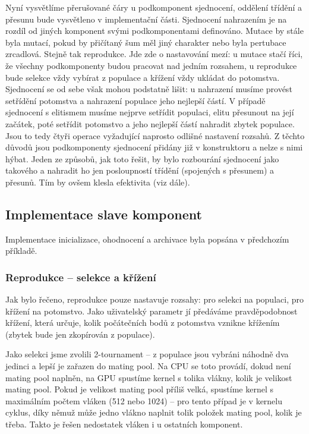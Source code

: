Nyní vysvětlíme přerušované čáry u podkomponent sjednocení, oddělení třídění a přesunu bude vysvětleno v implementační části. Sjednocení nahrazením je na rozdíl od jiných komponent svými podkomponentami definováno. Mutace by stále byla mutací, pokud by přičítaný šum měl jiný charakter nebo byla pertubace zrcadlová. Stejně tak reprodukce. Jde zde o nastavování mezí: u mutace stačí říci, že všechny podkomponenty budou pracovat nad jedním rozsahem, u reprodukce bude selekce vždy vybírat z populace a křížení vždy ukládat do potomstva. Sjednocení se od sebe však mohou podstatně lišit: u nahrazení musíme provést setřídění potomstva a nahrazení populace jeho nejlepší částí. V případě sjednocení s elitismem musíme nejprve setřídit populaci, elitu přesunout na její začátek, poté setřídit potomstvo a jeho nejlepší částí nahradit zbytek populace. Jsou to tedy čtyři operace vyžadující naprosto odlišné nastavení rozsahů. Z těchto důvodů jsou podkomponenty sjednocení přidány již v konstruktoru a nelze s nimi hýbat. Jeden ze způsobů, jak toto řešit, by bylo rozbourání sjednocení jako takového a nahradit ho jen posloupností třídění (spojených s přesunem) a přesunů. Tím by ovšem klesla efektivita (viz dále).

\subsection{Implementace slave komponent}

Implementace inicializace, ohodnocení a archivace byla popsána v předchozím příkladě.

\subsubsection{Reprodukce -- selekce a křížení}

Jak bylo řečeno, reprodukce pouze nastavuje rozsahy: pro selekci na populaci, pro křížení na potomstvo. Jako uživatelský parametr jí předáváme pravděpodobnost křížení, která určuje, kolik počátečních bodů z potomstva vznikne křížením (zbytek bude jen zkopírován z populace).

Jako selekci jsme zvolili 2-tournament -- z populace jsou vybráni náhodně dva jedinci a lepší je zařazen do mating pool. Na CPU se toto provádí, dokud není mating pool naplněn, na GPU spustíme kernel s tolika vlákny, kolik je velikost mating pool. Pokud je velikost mating pool příliš velká, spustíme kernel s maximálním počtem vláken (512 nebo 1024) -- pro tento případ je v kernelu cyklus, díky němuž může jedno vlákno naplnit tolik položek mating pool, kolik je třeba. Takto je řešen nedostatek vláken i u ostatních komponent.

